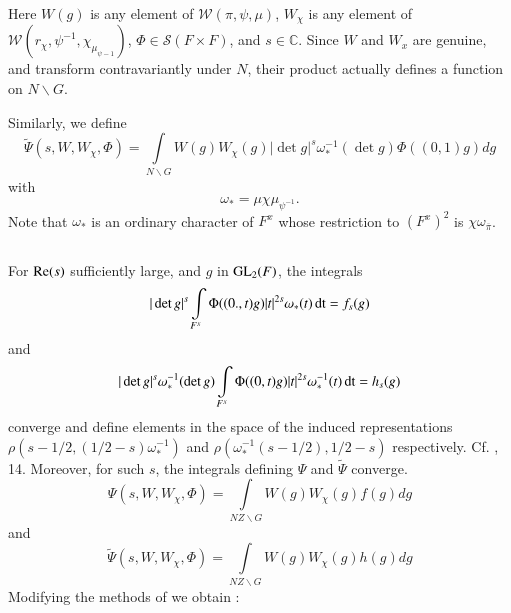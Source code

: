 Here $W(g)$ is any element of $\mathscr{W}(\pi,\psi,\mu)$, $W_{\chi}$ is any element of\break $\mathscr{W}(r_{\chi},\psi^{-1},\chi_{\mu_{\psi-1}})$, $\Phi\in \mathscr{S}(F\times F)$, and $s\in \mathbb{C}$. Since $W$ and $W_{x}$ are genuine, and transform contravariantly under $N$, their product actually defines a function on $N\backslash G$.

Similarly, we define
\begin{equation}
\widetilde{\Psi}(s,W,W_{\chi},\Phi)=\int\limits_{N\backslash G}W(g)W_{\chi}(g)|\det g|^{s}\omega^{-1}_{*}(\det g)\Phi((0,1)g)dg\label{art1-eq5.1.2}
\end{equation}
with 
\begin{equation}
\omega_{*}=\mu \chi \mu_{\psi^{-1}}.\label{art1-eq5.1.3}
\end{equation}
Note that $\omega_{*}$ is an ordinary character of $F^{x}$ whose restriction to $(F^{x})^{2}$ is $\chi \omega_{\overline{\pi}}$.

\subsection{}\label{art1-sec5.2}\pageoriginale
For $\mathrm{Re}(s)$ sufficiently large, and $g$ in $\mathrm{GL}_{2}(F)$, the integrals
\setcounter{equation}{0}
\begin{equation}
|\det g|^{s}\int\limits_{F^{x}}\Phi ((0.,t)g)|t|^{2s}\omega_{*}(t)\operatorname{dt}=f_{s}(g)\label{art1-eq5.2.1}
\end{equation}
and
\begin{equation}
|\det g|^{s}\omega^{-1}_{*}(\det g)\int\limits_{F^{x}}\Phi((0,t)g)|t|^{2s}\omega^{-1}_{*}(t)\operatorname{dt} = h_{s}(g)\label{art1-eq5.2.2}
\end{equation}
converge and define elements in the space of the induced representations $\rho(s-1/2, (1/2-s)\omega^{-1}_{*})$ and $\rho(\omega^{-1}_{*}(s-1/2),1/2-s)$ respectively. Cf. \cite{Ja}, 14. Moreover, for such $s$, the integrals defining $\Psi$ and $\widetilde{\Psi}$ converge.
\begin{equation}
\Psi(s,W,W_{\chi},\Phi)=\int\limits_{NZ\backslash G}W(g)W_{\chi}(g)f(g)dg\label{art1-eq5.2.3}
\end{equation}
and
$$
\widetilde{\Psi}(s,W,W_{\chi},\Phi)=\int\limits_{NZ\backslash G}W(g)W_{\chi}(g)h(g)dg
$$
Modifying the methods of \cite{Ja} we obtain :

